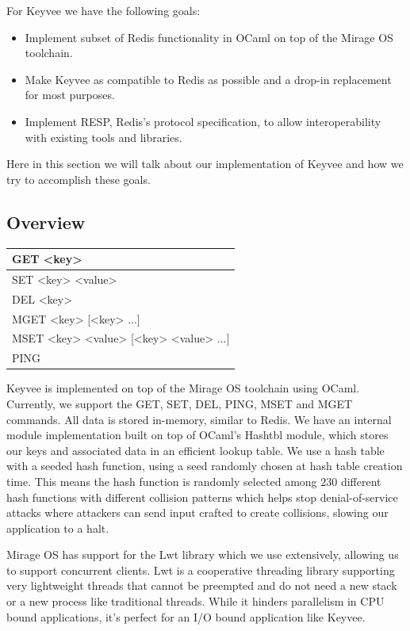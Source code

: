 \documentclass[english,10pt,twocolumn]{article}
\begin{document}
For Keyvee we have the following goals:

\begin{itemize}
  \item Implement subset of Redis functionality in OCaml on top of the Mirage OS toolchain.
  \item Make Keyvee as compatible to Redis as possible and a drop-in replacement for most purposes.
  \item Implement RESP, Redis's protocol specification, to allow interoperability with existing tools and libraries.
\end{itemize}

Here in this section we will talk about our implementation of Keyvee and how we try to accomplish these goals.

\subsection{Overview}

\begin{center}
  \begin{tabular}{ | l | }
    \hline
    GET <key> \\ \hline
    SET <key> <value> \\ \hline
    DEL <key> \\ \hline
    MGET <key> [<key> ...] \\ \hline
    MSET <key> <value> [<key> <value> ...] \\ \hline
    PING \\ \hline
  \end{tabular}
\end{center}



Keyvee is implemented on top of the Mirage OS toolchain using OCaml.
Currently, we support the GET, SET, DEL, PING, MSET and MGET commands.
All data is stored in-memory, similar to Redis.
We have an internal module implementation built on top of OCaml's Hashtbl module, which stores our keys and associated data in an efficient lookup table.
We use a hash table with a seeded hash function, using a seed randomly chosen at hash table creation time.
This means the hash function is randomly selected among 230 different hash functions with different collision patterns which helps stop denial-of-service attacks where attackers can send input crafted to create collisions, slowing our application to a halt.

Mirage OS has support for the Lwt library which we use extensively, allowing us to support concurrent clients.
Lwt is a cooperative threading library supporting very lightweight threads that cannot be preempted and do not need a new stack or a new process like traditional threads.
While it hinders parallelism in CPU bound applications, it's perfect for an I/O bound application like Keyvee.
\end{document}
